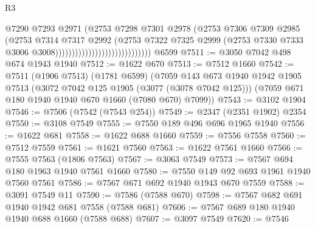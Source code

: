 \begin{lexlean}{R3}
\begin{coremodule}
                                                    @7290
                                                    @7293
                                                    @2971
                                                    (@2753
                                                      @7298
                                                      @7301
                                                      @2978
                                                      (@2753
                                                        @7306
                                                        @7309
                                                        @2985
                                                        (@2753
                                                          @7314
                                                          @7317
                                                          @2992
                                                          (@2753
                                                            @7322
                                                            @7325
                                                            @2999
                                                            (@2753
                                                              @7330
                                                              @7333
                                                              @3006
                                                              @3008)))))))))))))))))))))))))))))
    @6599
@7511 := @3050 @7042 @498 @674 @1943 @1940
@7512 := @1622 @670
@7513 := @7512 @1660
@7542 := @7511
    (@1906 @7513)
    (@1781 @6599)
    (@7059
      @143
      @673
      @1940
      @1942
      @1905
      @7513
      (@3072 @7042 @125 @1905 (@3077 (@3078 @7042 @125)))
      (@7059 @671 @180 @1940 @1940 @670 @1660 (@7080 @670) @7099))
@7543 := @3102 @1904
@7546 := @7506 (@7542 (@7543 @254))
@7549 := @2347 (@2351 @1902) @2354
@7550 := @3108 @7549
@7555 := @7550 @189 @496 @696 @1965 @1940
@7556 := @1622 @681
@7558 := @1622 @688 @1660
@7559 := @7556 @7558
@7560 := @7512 @7559
@7561 := @1621 @7560
@7563 := @1622 @7561 @1660
@7566 := @7555 @7563 (@1806 @7563)
@7567 := @3063 @7549
@7573 := @7567 @694 @180 @1963 @1940 @7561 @1660
@7580 := @7550 @149 @92 @693 @1961 @1940 @7560 @7561
@7586 := @7567 @671 @692 @1940 @1943 @670 @7559
@7588 := @3091 @7549 @11
@7590 := @7586 (@7588 @670)
@7598 := @7567 @682 @691 @1940 @1942 @681 @7558 (@7588 @681)
@7606 := @7567 @689 @180 @1940 @1940 @688 @1660 (@7588 @688)
@7607 := @3097 @7549
@7620 := @7546

\end{coremodule}
\end{lexlean}
